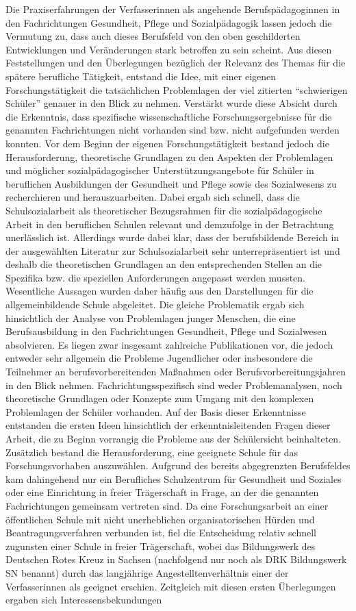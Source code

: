 Die Praxiserfahrungen der Verfasserinnen als angehende Berufspädagoginnen in den Fachrichtungen Gesundheit, Pflege und Sozialpädagogik lassen jedoch die Vermutung zu, dass auch dieses Berufsfeld von den oben geschilderten Entwicklungen und Veränderungen stark betroffen zu sein scheint. Aus diesen Feststellungen und den Überlegungen bezüglich der Relevanz des Themas für die spätere berufliche Tätigkeit, entstand die Idee, mit einer eigenen Forschungstätigkeit die tatsächlichen Problemlagen der viel zitierten "`schwierigen Schüler"' genauer in den Blick zu nehmen. Verstärkt wurde diese Absicht durch die Erkenntnis, dass spezifische wissenschaftliche Forschungsergebnisse für die genannten Fachrichtungen nicht vorhanden sind bzw. nicht aufgefunden werden konnten. Vor dem Beginn der eigenen Forschungstätigkeit bestand jedoch die Herausforderung, theoretische Grundlagen zu den Aspekten der Problemlagen und möglicher sozialpädagogischer Unterstützungsangebote für Schüler in beruflichen Ausbildungen der Gesundheit und Pflege sowie des Sozialwesens zu recherchieren und herauszuarbeiten. Dabei ergab sich schnell, dass die Schulsozialarbeit als theoretischer Bezugsrahmen für die sozialpädagogische Arbeit in den beruflichen Schulen relevant und demzufolge in der Betrachtung unerlässlich ist. Allerdings wurde dabei klar, dass der berufsbildende Bereich in der ausgewählten Literatur zur Schulsozialarbeit sehr unterrepräsentiert ist und deshalb die theoretischen Grundlagen an den entsprechenden Stellen an die Spezifika bzw. die speziellen Anforderungen angepasst werden mussten. Wesentliche Aussagen wurden daher häufig aus den Darstellungen für die allgemeinbildende Schule abgeleitet. Die gleiche Problematik ergab sich hinsichtlich der Analyse von Problemlagen junger Menschen, die eine Berufsausbildung in den Fachrichtungen Gesundheit, Pflege und Sozialwesen absolvieren. Es liegen zwar insgesamt zahlreiche Publikationen vor, die jedoch entweder sehr allgemein die Probleme Jugendlicher oder insbesondere die Teilnehmer an berufsvorbereitenden Maßnahmen oder Berufsvorbereitungsjahren in den Blick nehmen. Fachrichtungsspezifisch sind weder Problemanalysen, noch theoretische Grundlagen oder Konzepte zum Umgang mit den komplexen Problemlagen der Schüler vorhanden. Auf der Basis dieser Erkenntnisse entstanden die ersten Ideen hinsichtlich der erkenntnisleitenden Fragen dieser Arbeit, die zu Beginn vorrangig die Probleme aus der Schülersicht beinhalteten. Zusätzlich bestand die Herausforderung, eine geeignete Schule für das Forschungsvorhaben auszuwählen. Aufgrund des bereits abgegrenzten Berufsfeldes kam dahingehend nur ein Berufliches Schulzentrum für Gesundheit und Soziales oder eine Einrichtung in freier Trägerschaft in Frage, an der die genannten Fachrichtungen gemeinsam vertreten sind. Da eine Forschungsarbeit an einer öffentlichen Schule mit nicht unerheblichen organisatorischen Hürden und Beantragungsverfahren verbunden ist, fiel die Entscheidung relativ schnell zugunsten einer Schule in freier Trägerschaft, wobei das Bildungswerk des Deutschen Rotes Kreuz in Sachsen (nachfolgend nur noch als DRK Bildungswerk SN benannt) durch das langjährige Angestelltenverhältnis einer der Verfasserinnen als geeignet erschien. Zeitgleich mit diesen ersten Überlegungen ergaben sich Interessensbekundungen 